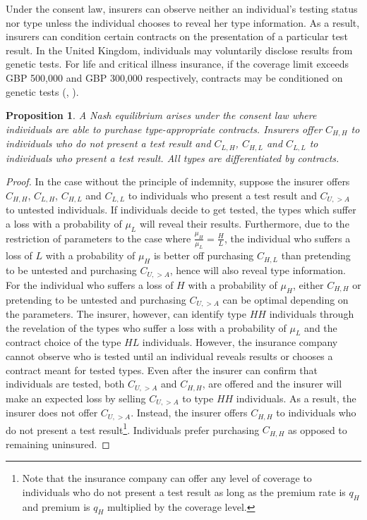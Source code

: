\documentclass[nonatbib,preprint,12pt]{elsarticle}
\theoremstyle{plain}
\newtheorem{prop}[theorem]{Proposition}
\theoremstyle{definition}
\theoremstyle{plain}
\theoremstyle{TheoremNum}
\theoremstyle{CorollaryNum}
\theoremstyle{PropositionNum}
\theoremstyle{TheoremNum}
\begin{document}
Under the consent law, insurers can observe neither an individual's testing status nor type unless the individual chooses to reveal her type information. As a result, insurers can condition certain contracts on the presentation of a particular test result. In the United Kingdom, individuals may voluntarily disclose results from genetic tests. For life and critical illness insurance, if the coverage limit exceeds GBP 500,000 and GBP 300,000 respectively, contracts may be conditioned on genetic tests (\citeauthor{ABI_2018}, \citeyear{ABI_2018}). 

\setcounter{theorem}{8}
\renewcommand{\thetheorem}{\arabic{theorem}}
\begin{prop}
A Nash equilibrium arises under the consent law where individuals are able to purchase type-appropriate contracts. Insurers offer $C_{H,H}$ to individuals who do not present a test result and $C_{L,H}$, $C_{H,L}$ and $C_{L,L}$ to individuals who present a test result. All types are differentiated by contracts.
\end{prop}

\begin{proof}
In the case without the principle of indemnity, suppose the insurer offers $C_{H,H}$, $C_{L,H}$, $C_{H,L}$ and $C_{L,L}$ to individuals who present a test result and $C_{U,>A}$ to untested individuals. If individuals decide to get tested, the types which suffer a loss with a probability of $\mu_L$ will reveal their results. Furthermore, due to the restriction of parameters to the case where $\frac{\mu_H}{\mu_L} = \frac{H}{L}$, the individual who suffers a loss of $L$ with a probability of $\mu_H$ is better off purchasing $C_{H,L}$ than pretending to be untested and purchasing $C_{U,>A}$, hence will also reveal type information. For the individual who suffers a loss of $H$ with a probability of $\mu_H$, either $C_{H,H}$ or pretending to be untested and purchasing $C_{U,>A}$ can be optimal depending on the parameters. The insurer, however, can identify type $HH$ individuals through the revelation of the types who suffer a loss with a probability of $\mu_L$ and the contract choice of the type  $HL$ individuals. However, the insurance company cannot observe who is tested until an individual reveals results or chooses a contract meant for tested types. Even after the insurer can confirm that individuals are tested, both $C_{U,>A}$ and $C_{H,H}$, are offered and the insurer will make an expected loss by selling $C_{U,>A}$ to type $HH$ individuals. As a result, the insurer does not offer $C_{U,>A}$. Instead, the insurer offers $C_{H,H}$ to individuals who do not present a test result\footnote{Note that the insurance company can offer any level of coverage to individuals who do not present a test result as long as the premium rate is $q_H$ and premium is $q_H$ multiplied by the coverage level.}. Individuals prefer purchasing $C_{H,H}$ as opposed to remaining uninsured.
\end{proof}
\end{document}
